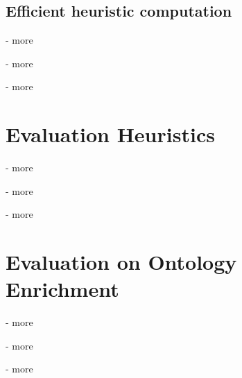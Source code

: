 \subsection{Efficient heuristic computation}
- more

- more

- more



\section{Evaluation Heuristics}
- more

- more

- more



\section{Evaluation on Ontology Enrichment}
- more

- more

- more


